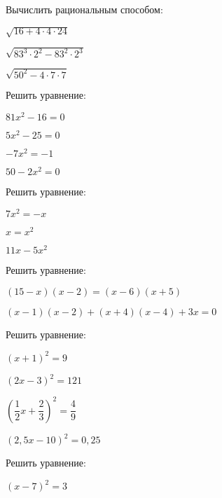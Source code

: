 %
%
%
%
\begin{class}[number=1]
	\begin{listofex}
		\item Вычислить рациональным способом:
		\begin{enumcols}[itemcolumns=3]
			\item \( \sqrt{16+4\cdot4\cdot24} \)
			\item \( \sqrt{83^3\cdot2^2-83^2\cdot2^3} \)
			\item \( \sqrt{50^2-4\cdot7\cdot7} \)
		\end{enumcols}
		\item Решить уравнение:
		\begin{enumcols}[itemcolumns=4]
			\item \( 81x^2-16=0 \)
			\item \( 5x^2-25=0 \)
			\item \( -7x^2=-1 \)
			\item \( 50-2x^2=0 \)
		\end{enumcols}
		\item Решить уравнение:
		\begin{enumcols}[itemcolumns=3]
			\item \( 7x^2=-x \)
			\item \( x=x^2 \)
			\item \( 11x-5x^2 \)
		\end{enumcols}
		\item Решить уравнение:
		\begin{enumcols}[itemcolumns=2]
			\item \( (15-x)(x-2)=(x-6)(x+5) \)
			\item \( (x-1)(x-2)+(x+4)(x-4)+3x=0 \)
		\end{enumcols}
		\item Решить уравнение:
		\begin{enumcols}[itemcolumns=2]
			\item \( (x+1)^2=9 \)
			\item \( (2x-3)^2=121 \)
			\item \( \left( \dfrac{1}{2}x+\dfrac{2}{3} \right)^2=\dfrac{4}{9} \)
			\item \( (2,5x-10)^2=0,25 \)
		\end{enumcols}
		\item Решить уравнение:
		\begin{enumcols}[itemcolumns=2]
			\item \( (x-7)^2=3 \)

\end{enumcols}
\end{listofex}
\end{class}
